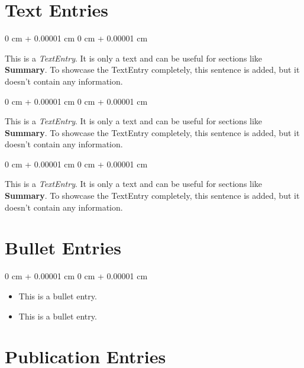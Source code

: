 \documentclass[10pt, letterpaper]{article}
\newenvironment{highlightsforbulletentries}{
    \begin{itemize}[
        topsep=0.10 cm,
        parsep=0.10 cm,
        partopsep=0pt,
        itemsep=0pt,
        leftmargin=10pt
    ]
}{
    \end{itemize}
} %
\newenvironment{onecolentry}{
    \begin{adjustwidth}{
        0 cm + 0.00001 cm
    }{
        0 cm + 0.00001 cm
    }
}{
    \end{adjustwidth}
} %
\begin{document}
    \section{Text Entries}



        
        \begin{onecolentry}
            This is a \textit{TextEntry}. It is only a text and can be useful for sections like \textbf{Summary}. To showcase the TextEntry completely, this sentence is added, but it doesn't contain any information.
        \end{onecolentry}

        \vspace{0.2 cm}

        \begin{onecolentry}
            This is a \textit{TextEntry}. It is only a text and can be useful for sections like \textbf{Summary}. To showcase the TextEntry completely, this sentence is added, but it doesn't contain any information.
        \end{onecolentry}

        \vspace{0.2 cm}

        \begin{onecolentry}
            This is a \textit{TextEntry}. It is only a text and can be useful for sections like \textbf{Summary}. To showcase the TextEntry completely, this sentence is added, but it doesn't contain any information.
        \end{onecolentry}


    
    \section{Bullet Entries}

    \begin{onecolentry}
        \begin{highlightsforbulletentries}


        \item This is a bullet entry.

        \item This is a bullet entry.


        \end{highlightsforbulletentries}
    \end{onecolentry}

    \section{Publication Entries}
\end{document}

